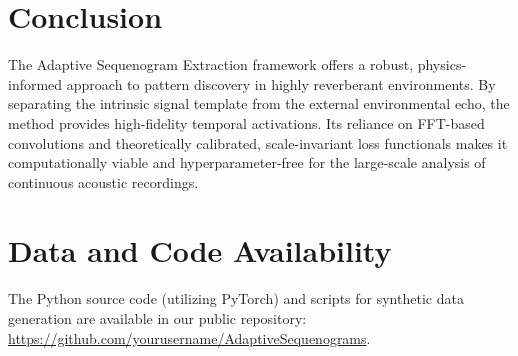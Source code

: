 \documentclass[11pt,a4paper]{article}
\begin{document}
\section{Conclusion}
The Adaptive Sequenogram Extraction framework offers a robust, physics-informed approach to pattern discovery in highly reverberant environments. By separating the intrinsic signal template from the external environmental echo, the method provides high-fidelity temporal activations. Its reliance on FFT-based convolutions and theoretically calibrated, scale-invariant loss functionals makes it computationally viable and hyperparameter-free for the large-scale analysis of continuous acoustic recordings.

\section*{Data and Code Availability}
The Python source code (utilizing PyTorch) and scripts for synthetic data generation are available in our public repository: \url{https://github.com/yourusername/AdaptiveSequenograms}.



\end{document}
